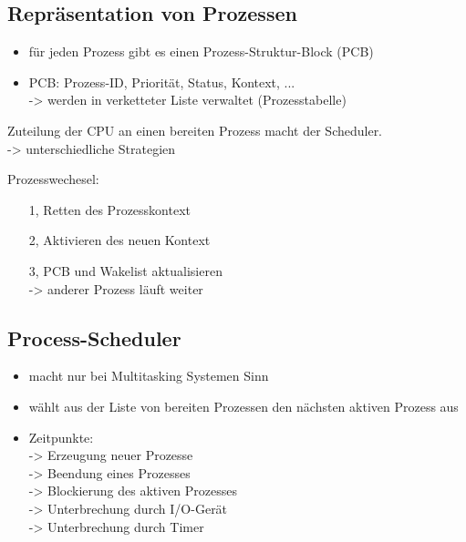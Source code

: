 \documentclass{article}
\begin{document}
\subsection{Repräsentation von Prozessen}

\begin{itemize}
    \item für jeden Prozess gibt es einen Prozess-Struktur-Block (PCB)
    \item PCB: Prozess-ID, Priorität, Status, Kontext, ... \\
          \hspace*{2em} -> werden in verketteter Liste verwaltet (Prozesstabelle)
\end{itemize}


Zuteilung der CPU an einen bereiten Prozess macht der Scheduler. \\
\hspace*{3em} -> unterschiedliche Strategien

Prozesswechesel:
\begin{itemize}
    \item[1,] Retten des Prozesskontext
    \item[2,] Aktivieren des neuen Kontext
    \item[3,] PCB und Wakelist aktualisieren \\
        \hspace*{2em} -> anderer Prozess läuft weiter
\end{itemize}

\subsection{Process-Scheduler}

\begin{itemize}
    \item macht nur bei Multitasking Systemen Sinn
    \item wählt aus der Liste von bereiten Prozessen den nächsten aktiven Prozess aus
    \item Zeitpunkte: \\
          \hspace*{2em} -> Erzeugung neuer Prozesse \\
          \hspace*{2em} -> Beendung eines Prozesses \\
          \hspace*{2em} -> Blockierung des aktiven Prozesses \\
          \hspace*{2em} -> Unterbrechung durch I/O-Gerät \\
          \hspace*{2em} -> Unterbrechung durch Timer \\
\end{itemize}
\end{document}
